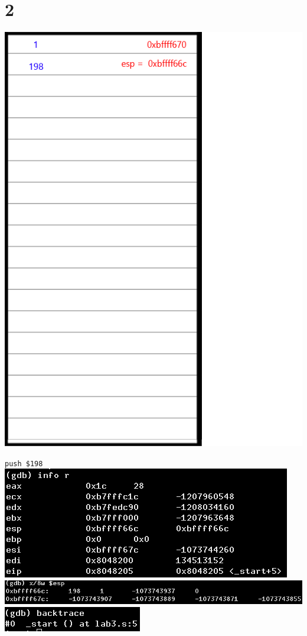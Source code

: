 \documentclass{article}
\begin{document}
\section*{2}
\begin{minipage}{5cm}
\includegraphics[scale=0.3]{s2.png}
\end{minipage}
\begin{minipage}{8cm}
\verb|push $198|\\
\includegraphics[scale=0.4]{info2.png} \\
\includegraphics[scale=0.3]{x2.png} \\
\includegraphics[scale=0.5]{bt2.png} \\
\end{minipage}
\clearpage
\end{document}
